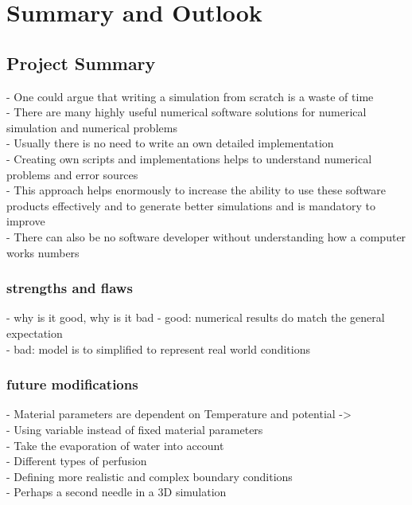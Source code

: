 \documentclass[parskip=half, titlepage=yes, 12pt, BCOR=12mm, DIV=calc]{scrartcl}
\begin{document}

\section{Summary and Outlook}

\subsection{Project Summary}
- One could argue that writing a simulation from scratch is a waste of time \\
- There are many highly useful numerical software solutions for numerical simulation and numerical problems \\
- Usually there is no need to write an own detailed implementation \\
- Creating own scripts and implementations helps to understand numerical problems and error sources \\
- This approach helps enormously to increase the ability to use these software products effectively and to generate better simulations and is mandatory to improve \\
- There can also be no software developer without understanding how a computer works numbers \\

\subsubsection{strengths and flaws}
- why is it good, why is it bad
- good: numerical results do match the general expectation \\
- bad: model is to simplified to represent real world conditions \\

\subsubsection{future modifications}
- Material parameters are dependent on Temperature and potential -> \\
- Using variable instead of fixed material parameters \\
- Take the evaporation of water into account \\ 
- Different types of perfusion \\
- Defining more realistic and complex boundary conditions \\
- Perhaps a second needle in a 3D simulation \\
\end{document}
